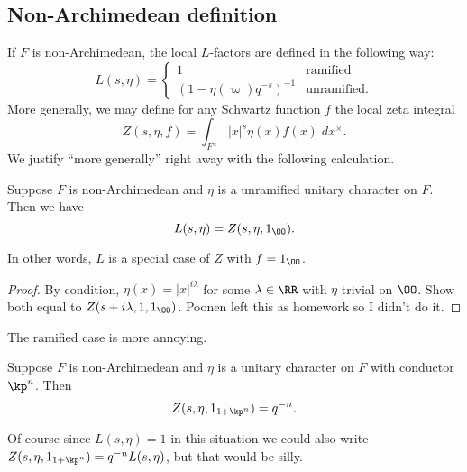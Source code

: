 \subsection{Non-Archimedean definition}
If $F$ is non-Archimedean,
the local $L$-factors are defined in the following way:
\[
  L(s, \eta) =
  \begin{cases}
    1 & \text{ramified} \\
    \left( 1 - \eta(\varpi) q^{-s} \right)^{-1} & \text{unramified}.
  \end{cases}
\]
More generally, we may define for any Schwartz function $f$ the local zeta integral
\[
  Z(s, \eta, f) = \int_{F^\times} |x|^s \eta(x) f(x) \; dx^\times.
\]
We justify ``more generally'' right away with the following calculation.
\begin{proposition}
  Suppose $F$ is non-Archimedean
  and $\eta$ is a unramified unitary character on $F$.
  Then we have
  \[ L(s, \eta) = Z(s, \eta, 1_\OO). \]
\end{proposition}
In other words, $L$ is a special case of $Z$ with $f = 1_\OO$.
\begin{proof}
  By condition, $\eta(x) = |x|^{i\lambda}$
  for some $\lambda \in \RR$ with $\eta$ trivial on $\OO$.
  Show both equal to $Z(s + i\lambda, 1, 1_\OO)$.
  Poonen left this as homework so I didn't do it.
\end{proof}
The ramified case is more annoying.
\begin{proposition}
  Suppose $F$ is non-Archimedean
  and $\eta$ is a unitary character on $F$ with conductor $\kp^n$.
  Then
  \[ Z(s, \eta, 1_{1+\kp^n}) = q^{-n}. \]
\end{proposition}
Of course since $L(s,\eta)=1$ in this situation we could also
write $Z(s, \eta, 1_{1+\kp^n}) = q^{-n} L(s, \eta)$,
but that would be silly.

